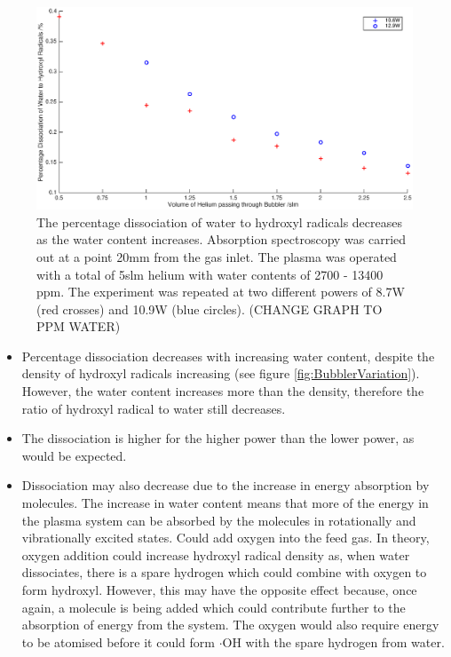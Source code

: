 \documentclass[11pt, oneside]{article}   	%
\begin{document}
\begin{figure}
    \centering
    \includegraphics[width=\textwidth]{Figures/BubblerDissociation.eps}
    \caption{The percentage dissociation of water to hydroxyl radicals decreases as the water content increases. Absorption spectroscopy was carried out at a point 20mm from the gas inlet. The plasma was operated with a total of 5slm helium with water contents of 2700 - 13400 ppm. The experiment was repeated at two different powers of 8.7W (red crosses) and 10.9W (blue circles). (CHANGE GRAPH TO PPM WATER)}
    \label{fig:BubblerDissociation}
\end{figure}

\begin{itemize}
    \item Percentage dissociation decreases with increasing water content, despite the density of hydroxyl radicals increasing (see figure \ref{fig:BubblerVariation}). However, the water content increases more than the density, therefore the ratio of hydroxyl radical to water still decreases.
    \item The dissociation is higher for the higher power than the lower power, as would be expected. 
    \item Dissociation may also decrease due to the increase in energy absorption by molecules. The increase in water content means that more of the energy in the plasma system can be absorbed by the molecules in rotationally and vibrationally excited states. Could add oxygen into the feed gas. In theory, oxygen addition could increase hydroxyl radical density as, when water dissociates, there is a spare hydrogen which could combine with oxygen to form hydroxyl. However, this may have the opposite effect because, once again, a molecule is being added which could contribute further to the absorption of energy from the system. The oxygen would also require energy to be atomised before it could form $\cdot$OH with the spare hydrogen from water.
\end{itemize}
\end{document}
